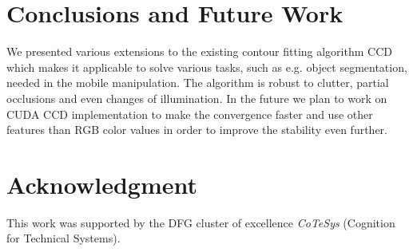 \documentclass[conference]{IEEEtran}
\begin{document}
\begin{table}[htbp]
\centering
{}
\caption{Experimental Results: Failure rate is the ratio between failures and all test cases. 
Run time is the average run time of all successful test cases, which characterizes the
computational cost. The tolerance is the converge criteria defined as the curve-displacement
between two successive iterations.}
\label{tab:qr}
\end{table}

\section{Conclusions and Future Work}
\label{sec:conclusions}
We presented various extensions to the existing contour fitting algorithm CCD
which makes it applicable to solve various tasks, such as e.g. object
segmentation, needed in the mobile manipulation. The algorithm is robust
to clutter, partial occlusions and even changes of illumination.
In the future we plan to work on CUDA CCD implementation to make the convergence 
faster and use other features than RGB color values in order to improve the stability
even further. 
\section*{Acknowledgment}
 This work was supported by the DFG cluster of excellence \emph{CoTeSys} (Cognition for Technical Systems).


\end{document}
